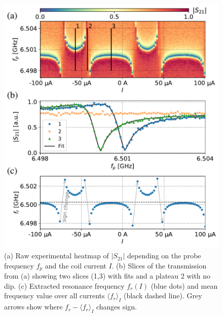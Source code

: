 \documentclass[%
 aip,
 draft,
 amsmath,amssymb,
 reprint,%
]{revtex4-1}
\begin{document}
\begin{figure}
\includegraphics[width=\linewidth]{anti_subplots}
\caption{(a) Raw experimental heatmap of $|S_{21}|$ depending on the probe frequency $f_p$ and the coil current $I$. (b) Slices of the transmission from (a) showing two slices (1,3) with fits and a plateau 2 with no dip. (c) Extracted resonance frequency $f_r(I)$ (blue dots) and mean frequency value over all currents $\langle f_r \rangle_{I}$ (black dashed line). Grey arrows show where $f_r - \langle f_r \rangle_{I}$ changes sign.}
\label{fig:anti_exp}
\end{figure}
\end{document}
